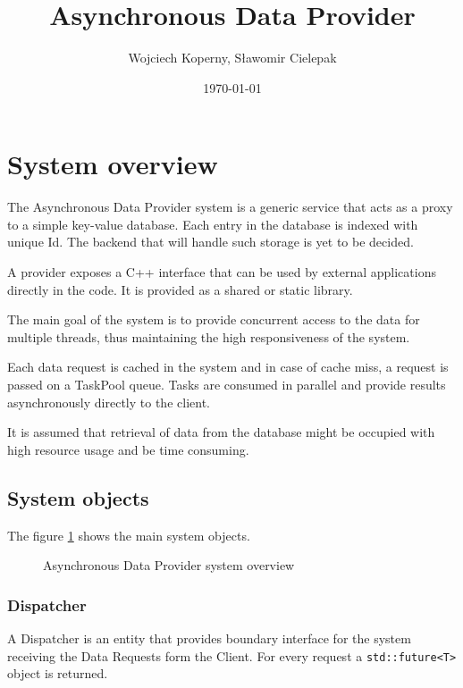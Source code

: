 \documentclass[table]{article}
\title{Asynchronous Data Provider}
\author{Wojciech Koperny, Sławomir Cielepak}
\date{\today}
\begin{document}
\maketitle



%
%
\section{System overview}

The Asynchronous Data Provider system is a generic service that acts as a proxy to a simple key-value
database. Each entry in the database is indexed with unique Id. The backend that will handle such storage
is yet to be decided.

A provider exposes a C++ interface that can be used by external applications directly in the code. It is
provided as a shared or static library.

The main goal of the system is to provide concurrent access to the data for multiple threads, thus
maintaining the high responsiveness of the system.

Each data request is cached in the system and in case of cache miss, a request is passed on a TaskPool
queue. Tasks are consumed in parallel and provide results asynchronously directly to the client.

It is assumed that retrieval of data from the database might be occupied with high resource usage and be
time consuming.

\subsection{System objects}

The figure \ref{fig:system_overview} shows the main system objects.
\begin{figure}[h]
    \centering
    \resizebox{.6\linewidth}{!}{}
    \caption{Asynchronous Data Provider system overview}
    \label{fig:system_overview}
\end{figure}


\subsubsection{Dispatcher}

A Dispatcher is an entity that provides boundary interface for the system receiving the Data Requests form
the Client. For every request a \texttt{std::future<T>} object is returned.
\end{document}
